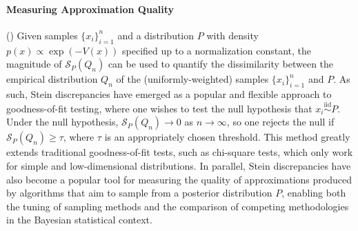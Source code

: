 \documentclass[12pt,paper=letter]{scrreprt}
\begin{document}
\paragraph{Measuring Approximation Quality} ()   
Given samples $\{x_i\}_{i=1}^n$ and a distribution $P$ with density $p(x) \propto \exp(-V(x))$ specified up to a normalization constant, the magnitude of $\mathcal{S}_P(Q_n)$ can be used to quantify the dissimilarity between the empirical distribution $Q_n$ of the (uniformly-weighted) samples $\{x_i\}_{i=1}^n$ and $P$.
As such, Stein discrepancies have emerged as a popular and flexible approach to goodness-of-fit testing, where one wishes to test the null hypothesis that $x_i \stackrel{\mathrm{iid}}{\sim} P$.
Under the null hypothesis, $\mathcal{S}_P(Q_n) \rightarrow 0$ as $n \rightarrow \infty$, so one rejects the null if $\mathcal{S}_P(Q_n) \geq \tau$, where $\tau$ is an appropriately chosen threshold.
This method greatly extends traditional goodness-of-fit tests, such as chi-square tests, which only work for simple and low-dimensional distributions.
In parallel, Stein discrepancies have also become a popular tool for measuring the quality of approximations produced by algorithms that aim to sample from a posterior distribution $P$, enabling both the tuning of sampling methods and the comparison of competing methodologies in the Bayesian statistical context.

 
\end{document}

